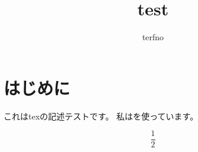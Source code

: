 \documentclass[a4paper]{article}
\begin{document}
  \title{test}
  \author{terfno}
  \maketitle

  \section{はじめに}
  これはtexの記述テストです。
  私は{\XeTeX}を使っています。

  $$
    \frac{1}{2}
  $$
\end{document}
